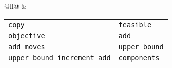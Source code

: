 \begin{adjustbox}{max width=\textwidth}
\begin{tabular}{@{}ll@{}}
    \midrule
                       & \begin{tabular}{ll}
                                                          \texttt{copy}                         & \texttt{feasible}     \\
                                                          \texttt{objective}                    & \texttt{add}          \\
                                                          \texttt{add\_moves}                   & \texttt{upper\_bound} \\
                                                          \texttt{upper\_bound\_increment\_add} & \texttt{components}   \\
                                                        \end{tabular}             \\


\end{tabular}
\end{adjustbox}
